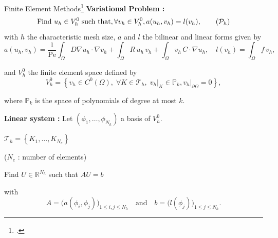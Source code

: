 \addtocounter{subappendixframenumber}{1}
\begin{appendixframe}{Finite Element Methods\footcite{Ern2004TheoryAP}}	
	\textbf{Variational Problem :} 
	\begin{equation}
		\label{eq:weakform}
		\text{Find } u_h\in V_h^0 \;\text{such that}, \forall v_h\in V_h^0, a(u_h,v_h)=l(v_h),
		\tag{$\mathcal{P}_h$}
	\end{equation}
	\vspace{1pt}
	with $h$ the characteristic mesh size, $a$ and $l$ the bilinear and linear forms given by
	\vspace{-3pt}
	\begin{equation*}
		a(u_h,v_h)=
		\frac{1}{\text{Pe}} \int_{\Omega}D \nabla u_h \cdot  \nabla v_h+
		\int_{\Omega} R \, u_h \, v_h  +
		\int_{\Omega} v_h \, C \cdot \nabla u_h, \quad l(v_h)=\int_{\Omega} f \, v_h,
	\end{equation*}

	\begin{minipage}[t]{0.7\linewidth}
		\vspace{-3pt}
		and $V_h^0$ the finite element space defined by
		\vspace{-3pt}
		\begin{equation*}
			V_h^0 = \left\{v_h\in C^0(\Omega),\; \forall K\in \mathcal{T}_h,\; v_h\vert_{K}\in\mathbb{P}_k,v_h\vert_{\partial\Omega}=0\right\},
		\end{equation*}
		
		\vspace{-3pt}
		where $\mathbb{P}_k$ is the space of polynomials of degree at most $k$.
		
		\vspace{10pt}
		\textbf{Linear system :} Let $(\phi_1,\dots,\phi_{N_h})$ a basis of $V_h^0$.
	\end{minipage} \qquad \begin{minipage}[t][][b]{0.2\linewidth}
		\centering
		
		\footnotesize
		$\mathcal{T}_h = \left\{K_1,\dots,K_{N_e}\right\}$
		
		\tiny
		($N_e$ : number of elements)
	\end{minipage}
	
	\vspace{-5pt}
	Find $U\in\mathbb{R}^{N_h}$ such that \hspace{40pt} $AU=b$
	
	with 
	\begin{equation*}
		A=\big(a(\phi_i,\phi_j)\big)_{1\le i,j\le N_h} \quad \text{and} \quad b=\big(l(\phi_j)\big)_{1\le j\le N_h}.
	\end{equation*}
	\vspace{-3pt}
\end{appendixframe}

